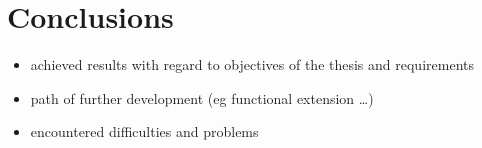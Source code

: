 \documentclass[a4paper,twoside,12pt]{book}
\begin{document}
\chapter{Conclusions}
\begin{itemize}
\item achieved results with regard to objectives of the thesis and requirements
\item path of further development (eg functional extension …)
\item encountered difficulties and problems
\end{itemize}



\backmatter 

\printbibliography           %
\end{document}
